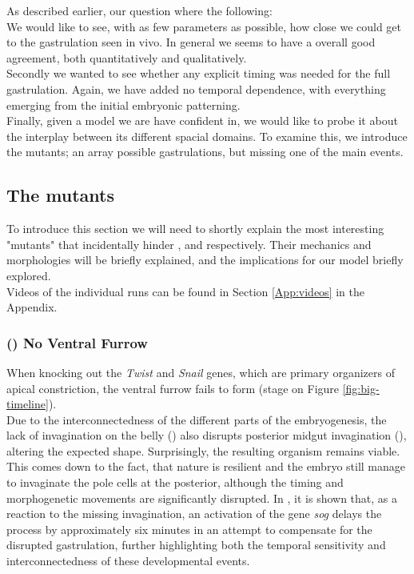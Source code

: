 As described earlier, our question where the following:\\

We would like to see, with as few parameters as possible, how close we could get to the gastrulation seen in vivo. In general we seems to have a overall good agreement, both quantitatively and qualitatively.\\ Secondly we wanted to see whether any explicit timing was needed for the full gastrulation. Again, we have added no temporal dependence, with everything emerging from the initial embryonic patterning. \\ 
Finally, given a model we are have confident in, we would like to probe it about the interplay between its different spacial domains. To examine this, we introduce the mutants; an array possible gastrulations, but missing one of the main events. 

\subsection{The mutants}
To introduce this section we will need to shortly explain the most interesting "mutants" that incidentally hinder ,  and  respectively. Their mechanics and morphologies will be briefly explained, and the implications for our model briefly explored. \\
Videos of the individual runs can be found in Section \ref{App:videos} in the Appendix.

\subsubsection{() No Ventral Furrow }
When knocking out the \textit{Twist} and \textit{Snail} genes, which are primary organizers of apical constriction, the ventral furrow fails to form (stage  on Figure \ref{fig:big-timeline}).\cite{leptin1991twist} \\

Due to the interconnectedness of the different parts of the embryogenesis, the lack of invagination on the belly () also disrupts posterior midgut invagination (), altering the expected shape. Surprisingly, the resulting organism remains viable.\cite{conte2012biomechanical} This comes down to the fact, that nature is resilient and the embryo still manage to invaginate the pole cells at the posterior, although the timing and morphogenetic movements are significantly disrupted. In , it is shown that, as a reaction to the missing invagination, an activation of the gene \textit{sog} delays the process by approximately six minutes in an attempt to compensate for the disrupted gastrulation, further highlighting both the temporal sensitivity and interconnectedness of these developmental events.\\

